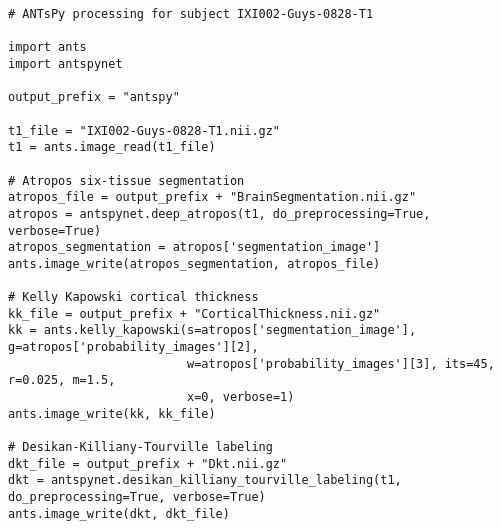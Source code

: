 


\begin{lstlisting}
# ANTsPy processing for subject IXI002-Guys-0828-T1

import ants
import antspynet

output_prefix = "antspy"

t1_file = "IXI002-Guys-0828-T1.nii.gz"
t1 = ants.image_read(t1_file)

# Atropos six-tissue segmentation
atropos_file = output_prefix + "BrainSegmentation.nii.gz"
atropos = antspynet.deep_atropos(t1, do_preprocessing=True, verbose=True)
atropos_segmentation = atropos['segmentation_image']
ants.image_write(atropos_segmentation, atropos_file)

# Kelly Kapowski cortical thickness
kk_file = output_prefix + "CorticalThickness.nii.gz"
kk = ants.kelly_kapowski(s=atropos['segmentation_image'], g=atropos['probability_images'][2],
                         w=atropos['probability_images'][3], its=45, r=0.025, m=1.5,
                         x=0, verbose=1)
ants.image_write(kk, kk_file)

# Desikan-Killiany-Tourville labeling
dkt_file = output_prefix + "Dkt.nii.gz"
dkt = antspynet.desikan_killiany_tourville_labeling(t1, do_preprocessing=True, verbose=True)
ants.image_write(dkt, dkt_file)
\end{lstlisting}

